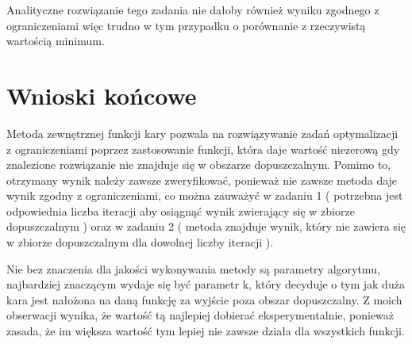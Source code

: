 \documentclass[a4paper,15pt]{article}
\begin{document}
Analityczne rozwiązanie tego zadania nie dałoby również wyniku zgodnego z ograniczeniami więc trudno w tym przypadku o porównanie z rzeczywistą wartością minimum.


\section{Wnioski końcowe}

Metoda zewnętrznej funkcji kary pozwala na rozwiązywanie zadań optymalizacji z ograniczeniami poprzez zastosowanie funkcji, która daje wartość niezerową gdy znalezione rozwiązanie nie znajduje się w obszarze dopuszczalnym. Pomimo to, otrzymany wynik należy zawsze zweryfikować, ponieważ nie zawsze metoda daje wynik zgodny z ograniczeniami, co można zauważyć w zadaniu 1 ( potrzebna jest odpowiednia liczba iteracji aby osiągnąć wynik zwierający się w zbiorze dopuszczalnym ) oraz w zadaniu 2 ( metoda znajduje wynik, który nie zawiera się w zbiorze dopuszczalnym dla dowolnej liczby iteracji ). 

Nie bez znaczenia dla jakości wykonywania metody są parametry algorytmu, najbardziej znaczącym wydaje się być parametr k, który decyduje o tym jak duża kara jest nałożona na daną funkcję za wyjście poza obszar dopuszczalny. Z moich obserwacji wynika, że wartość tą najlepiej dobierać eksperymentalnie, ponieważ zasada, że im większa wartość tym lepiej nie zawsze działa dla wszystkich funkcji.
  
\end{document}
